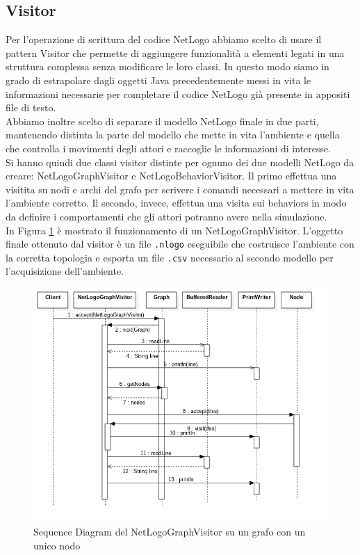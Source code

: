 \subsection{Visitor}
Per l'operazione di scrittura del codice NetLogo abbiamo scelto di usare il pattern Visitor che permette di aggiungere funzionalità a elementi legati in una struttura complessa senza modificare le loro classi. In questo modo siamo in grado di estrapolare dagli oggetti Java precedentemente messi in vita le informazioni necessarie per completare il codice NetLogo già presente in appositi file di testo.\\
Abbiamo inoltre scelto di separare il modello NetLogo finale in due parti, mantenendo distinta la parte del modello che mette in vita l'ambiente e quella che controlla i movimenti degli attori e raccoglie le informazioni di interesse.\\
Si hanno quindi due classi visitor distinte per ognuno dei due modelli NetLogo da creare: NetLogoGraphVisitor e NetLogoBehaviorVisitor. Il primo effettua una visitita su nodi e archi del grafo per scrivere i comandi necessari a mettere in vita l'ambiente corretto. Il secondo, invece, effettua una visita sui behaviors in modo da definire i comportamenti che gli attori potranno avere nella simulazione.\\
In Figura \ref{fig:visitor-sequence} è mostrato il funzionamento di un NetLogoGraphVisitor. L'oggetto finale ottenuto dal visitor è un file \texttt{.nlogo} eseguibile che costruisce l'ambiente con la corretta topologia e esporta un file \texttt{.csv} necessario al secondo modello per l'acquisizione dell'ambiente.
\begin{figure}[htbp]
\centering
\includegraphics[width=\textwidth,height=\textheight,keepaspectratio]{images/visitor-sequence.png}
\caption{Sequence Diagram del NetLogoGraphVisitor su un grafo con un unico nodo}
\label{fig:visitor-sequence}
\end{figure}